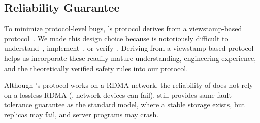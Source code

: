 \subsection{Reliability Guarantee} \label{sec:guarantees}

% 
To minimize protocol-level bugs, \xxx's protocol derives from a viewstamp-based 
protocol~\cite{paxos:practical}. We made this design choice because \paxos is 
notoriously difficult to 
understand~\cite{raft:usenix14,paxos:simple,paxos,paxos:complex}, 
implement~\cite{paxos:live,paxos:practical}, or 
verify~\cite{modist:nsdi09,demeter:sosp11}. Deriving from a viewstamp-based 
protocol~\cite{paxos:practical} helps us incorporate these 
readily mature understanding, engineering experience, and the theoretically 
verified safety rules into our protocol.

Although \xxx's \paxos protocol works on a RDMA network, the reliability of 
\xxx does not rely on a lossless RDMA (\eg, network devices can fail). \xxx 
still provides same fault-tolerance guarantee as the standard \paxos model, 
where a stable storage exists, but replicas may fail, and server programs may 
crash.







